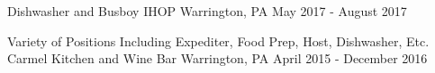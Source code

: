 

\begin{cventries}


  \cventrywork
    {Dishwasher and Busboy} %
    {IHOP} %
    {Warrington, PA} %
    {May 2017 - August 2017} %

  \cventrywork
    {Variety of Positions Including Expediter, Food Prep, Host, Dishwasher, Etc. } %
    {Carmel Kitchen and Wine Bar} %
    {Warrington, PA} %
    {April 2015 - December 2016} %
    
  \vspace{-5mm}

\end{cventries}
